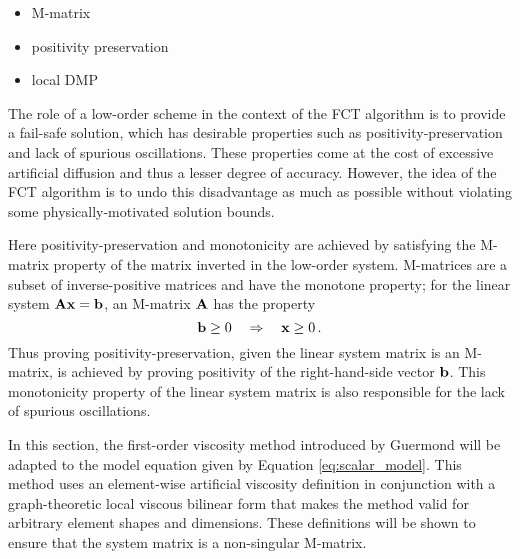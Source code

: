 
\begin{itemize}
  \item M-matrix
  \item positivity preservation
  \item local DMP
\end{itemize}

The role of a low-order scheme in the context of the FCT algorithm is to
provide a fail-safe solution, which has desirable properties such as
positivity-preservation and lack of spurious oscillations. These properties
come at the cost of excessive artificial diffusion and thus a lesser degree
of accuracy. However, the idea of the FCT algorithm is to undo this disadvantage
as much as possible without violating some physically-motivated solution bounds.

Here positivity-preservation and monotonicity are achieved by satisfying
the M-matrix property of the matrix inverted in the low-order system.
M-matrices are a subset of inverse-positive matrices and have the monotone
property; for the linear system $\mathbf{A}\mathbf{x} = \mathbf{b}$, an M-matrix $\mathbf{A}$ has the property
\begin{equation}
  \mathbf{b} \geq 0 \quad \Rightarrow \quad \mathbf{x} \geq 0 \,.
\end{equation}
Thus proving positivity-preservation, given the linear system matrix is an
M-matrix, is achieved by proving positivity of the right-hand-side vector $\mathbf{b}$.
This monotonicity property of the linear system matrix is also responsible for
the lack of spurious oscillations.

In this section, the first-order viscosity method introduced by Guermond
\cite{guermond_firstorder} will be adapted to the model equation given by
Equation \eqref{eq:scalar_model}. This method uses an element-wise artificial
viscosity definition in conjunction with a graph-theoretic local viscous
bilinear form that makes the method valid for arbitrary element shapes and
dimensions. These definitions will be shown to ensure that the system matrix
is a non-singular M-matrix.

